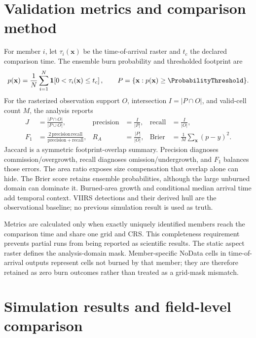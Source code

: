 \section{Validation metrics and comparison method}

For member $i$, let $\tau_i(\mathbf{x})$ be the time-of-arrival raster and $t_c$
the declared comparison time.  The ensemble burn probability and thresholded
footprint are
\begin{equation}
 p(\mathbf{x})=\frac{1}{N}\sum_{i=1}^{N}
 \mathbf{1}\!\left[0<\tau_i(\mathbf{x})\le t_c\right],\qquad
 P=\{\mathbf{x}:p(\mathbf{x})\ge\ProbabilityThreshold\}.
\end{equation}
For the rasterized observation support $O$, intersection $I=|P\cap O|$, and
valid-cell count $M$, the analysis reports
\begin{align}
 J&=\frac{|P\cap O|}{|P\cup O|}, &
 \mathrm{precision}&=\frac{I}{|P|}, &
 \mathrm{recall}&=\frac{I}{|O|},\\
 F_1&=\frac{2\,\mathrm{precision}\,\mathrm{recall}}
 {\mathrm{precision}+\mathrm{recall}}, &
 R_A&=\frac{|P|}{|O|}, &
 \mathrm{Brier}&=\frac{1}{M}\sum_{\mathbf{x}}(p-y)^2.
\end{align}
Jaccard is a symmetric footprint-overlap summary.  Precision diagnoses
commission/overgrowth, recall diagnoses omission/undergrowth, and $F_1$ balances
those errors.  The area ratio exposes size compensation that overlap alone can
hide.  The Brier score retains ensemble probabilities, although the large
unburned domain can dominate it.  Burned-area growth and conditional median
arrival time add temporal context.  VIIRS detections and their derived hull are
the observational baseline; no previous simulation result is used as truth.

Metrics are calculated only when exactly \EnsembleSize{} uniquely identified
members reach the comparison time and share one grid and CRS.  This completeness
requirement prevents partial runs from being reported as scientific results.
The static aspect raster defines the analysis-domain mask.  Member-specific
NoData cells in time-of-arrival outputs represent cells not burned by that
member; they are therefore retained as zero burn outcomes rather than treated
as a grid-mask mismatch.

\section{Simulation results and field-level comparison}

